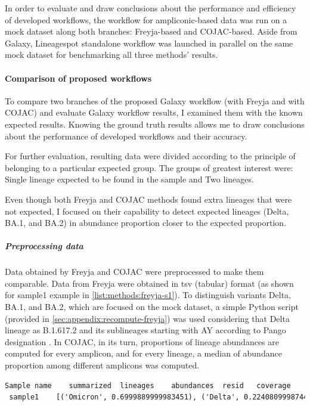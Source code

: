             In order to evaluate and draw conclusions about the performance and efficiency of developed workflows, the workflow for ampliconic-based data was run on a mock dataset along both branches: Freyja-based and COJAC-based. Aside from Galaxy, Lineagespot standalone workflow was launched in parallel on the same mock dataset for benchmarking all three methods' results.
            
            \paragraph{Comparison of proposed workflows} 
            To compare two branches of the proposed Galaxy workflow (with Freyja and with COJAC) and evaluate Galaxy workflow results, I examined them with the known expected results. Knowing the ground truth results allows me to draw conclusions about the performance of developed workflows and their accuracy. 
            
            For further evaluation, resulting data were divided according to the principle of belonging to a particular expected group. The groups of greatest interest were: Single lineage expected to be found in the sample and Two lineages.
            
            Even though both Freyja and COJAC methods found extra lineages that were not expected, I focused on their capability to detect expected lineages (Delta, BA.1, and BA.2) in abundance proportion closer to the expected proportion.

            
                \subparagraph{Preprocessing data} 
                Data obtained by Freyja and COJAC were preprocessed to make them comparable. Data from Freyja were obtained in \acrshort{tsv} (tabular) format (as shown for sample1 example in \cref{list:methods:freyja-s1}). To distinguish variants Delta, BA.1, and BA.2, which are focused on the mock dataset, a simple Python script (provided in \cref{sec:appendix:recompute-freyja}) was used considering that Delta lineage as B.1.617.2 and its sublineages starting with AY according to Pango designation \cite{otoole2021,covlineages}. In COJAC, in its turn, proportions of lineage abundances are computed for every amplicon, and for every lineage, a median of abundance proportion among different amplicons was computed.
                
                \begin{lstlisting}[language=xml, caption=Freyja output for sample 1 from mock dataset, label=list:methods:freyja-s1]
 Sample name	summarized	lineages	abundances	resid	coverage
 sample1 	[('Omicron', 0.6999889999983451), ('Delta', 0.22408099987442534), ('Other', 0.07552100018490182)]	BA.1.18 AY.4 BA.1.19 BA.1.1.13 BA.1.15.1 AY.38 BA.1.9 BA.1.16 B B.1.617.2 B.1.1.529 XS	0.23943700 0.11764700 0.11363600 0.10000000 0.09667000 0.06944400 0.06686400 0.06474800 0.06122400 0.03699000 0.01863400 0.01429700	7.611495978	99.95971667
                \end{lstlisting}
                
